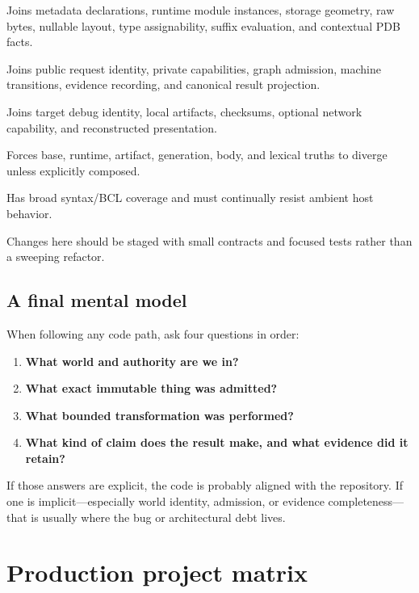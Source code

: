 \documentclass[11pt,oneside,openany]{book}
\begin{document}
\begin{description}[style=nextline]
  \item[Static-field authority] Joins metadata declarations, runtime module instances, storage geometry, raw bytes, nullable layout, type assignability, suffix evaluation, and contextual PDB facts.
  \item[Counterfactual runner] Joins public request identity, private capabilities, graph admission, machine transitions, evidence recording, and canonical result projection.
  \item[Source navigation] Joins target debug identity, local artifacts, checksums, optional network capability, and reconstructed presentation.
  \item[Edit-and-Continue] Forces base, runtime, artifact, generation, body, and lexical truths to diverge unless explicitly composed.
  \item[Constant evaluator] Has broad syntax/BCL coverage and must continually resist ambient host behavior.
\end{description}

Changes here should be staged with small contracts and focused tests rather than a sweeping refactor.

\section{A final mental model}

When following any code path, ask four questions in order:

\begin{enumerate}
  \item \textbf{What world and authority are we in?}
  \item \textbf{What exact immutable thing was admitted?}
  \item \textbf{What bounded transformation was performed?}
  \item \textbf{What kind of claim does the result make, and what evidence did it retain?}
\end{enumerate}

If those answers are explicit, the code is probably aligned with the repository. If one is implicit---especially world identity, admission, or evidence completeness---that is usually where the bug or architectural debt lives.

\appendix

\chapter{Production project matrix}
\label{app:projects}
\end{document}
